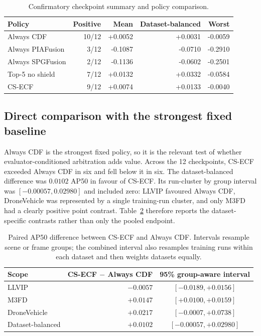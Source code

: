 \documentclass[preprint,11pt]{elsarticle}
\begin{document}
\begin{table}[t]
\centering
\small
\caption{Confirmatory checkpoint summary and policy comparison.}
\label{tab:policy}
\begin{tabular}{@{}lrrrr@{}}
\toprule
Policy & Positive & Mean & Dataset-balanced & Worst \\
\midrule
Always CDF & 10/12 & +0.0052 & +0.0031 & -0.0059 \\
Always PIAFusion & 3/12 & -0.1087 & -0.0710 & -0.2910 \\
Always SPGFusion & 2/12 & -0.1136 & -0.0602 & -0.2501 \\
Top-5 no shield & 7/12 & +0.0132 & +0.0332 & -0.0584 \\
CS-ECF & 9/12 & +0.0074 & +0.0133 & -0.0040 \\
\bottomrule
\end{tabular}
\end{table}

\subsection{Direct comparison with the strongest fixed baseline}

Always CDF is the strongest fixed policy, so it is the relevant test of whether
evaluator-conditioned arbitration adds value. Across the 12 checkpoints, CS-ECF
exceeded Always CDF in six and fell below it in six. The dataset-balanced
difference was \(0.0102\) AP50 in favour of CS-ECF. Its run-cluster by group
interval was \([-0.00057,0.02980]\) and included zero: LLVIP favoured Always
CDF, DroneVehicle was represented by a single training-run cluster, and only
M3FD had a clearly positive point contrast. Table~\ref{tab:cdf-paired} therefore
reports the dataset-specific contrasts rather than only the pooled endpoint.

\begin{table}[t]
\centering
\small
\caption{Paired AP50 difference between CS-ECF and Always CDF. Intervals
resample scene or frame groups; the combined interval also resamples training
runs within each dataset and then weights datasets equally.}
\label{tab:cdf-paired}
\begin{tabular}{@{}lrc@{}}
\toprule
Scope & CS-ECF \(-\) Always CDF & 95\% group-aware interval \\
\midrule
LLVIP & \(-0.0057\) & \([-0.0189,+0.0156]\) \\
M3FD & \(+0.0147\) & \([+0.0100,+0.0159]\) \\
DroneVehicle & \(+0.0217\) & \([-0.0007,+0.0738]\) \\
Dataset-balanced & \(+0.0102\) & \([-0.00057,+0.02980]\) \\
\bottomrule
\end{tabular}
\end{table}
\end{document}
